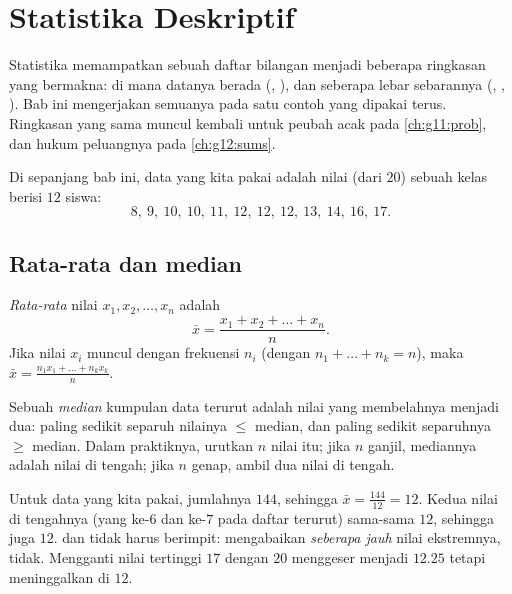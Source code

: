 \chapter{Statistika Deskriptif}\label{ch:g11:stat}

Statistika memampatkan sebuah daftar bilangan menjadi beberapa ringkasan yang
bermakna: di mana datanya berada (, ), dan seberapa lebar
sebarannya (, , ). Bab ini mengerjakan semuanya pada
satu contoh yang dipakai terus. Ringkasan yang sama muncul kembali untuk peubah
acak pada \cref{ch:g11:prob}, dan hukum peluangnya pada \cref{ch:g12:sums}.

Di sepanjang bab ini, data yang kita pakai adalah nilai (dari $20$) sebuah
kelas berisi $12$ siswa:
\[
8,\ 9,\ 10,\ 10,\ 11,\ 12,\ 12,\ 12,\ 13,\ 14,\ 16,\ 17 .
\]

\section{Rata-rata dan median}

\begin{definition}\label{def:g11:stat:mean}
\emph{Rata-rata} nilai $x_1, x_2, \dots, x_n$ adalah
\[
\bar x = \frac{x_1 + x_2 + \dots + x_n}{n}.
\]
Jika nilai $x_i$ muncul dengan frekuensi $n_i$ (dengan
$n_1 + \dots + n_k = n$), maka
$\bar x = \frac{n_1 x_1 + \dots + n_k x_k}{n}$.
\end{definition}

\begin{definition}[Median]\label{def:g11:stat:median}
Sebuah \emph{median} kumpulan data terurut adalah nilai yang
membelahnya menjadi dua: paling sedikit separuh nilainya $\leq$ median, dan
paling sedikit separuhnya $\geq$ median. Dalam praktiknya, urutkan $n$ nilai
itu; jika $n$ ganjil, mediannya adalah nilai di tengah; jika $n$ genap, ambil
 dua nilai di tengah.
\end{definition}

\begin{example}\label{ex:g11:stat:meanmedian}
Untuk data yang kita pakai, jumlahnya $144$, sehingga $\bar x = \frac{144}{12} =
12$. Kedua nilai di tengahnya (yang ke-$6$ dan ke-$7$ pada daftar terurut)
sama-sama $12$, sehingga  juga $12$.  dan  tidak harus
berimpit:  mengabaikan \emph{seberapa jauh} nilai ekstremnya, 
tidak. Mengganti nilai tertinggi $17$ dengan $20$ menggeser  menjadi
$12.25$ tetapi meninggalkan  di $12$.
\end{example}

